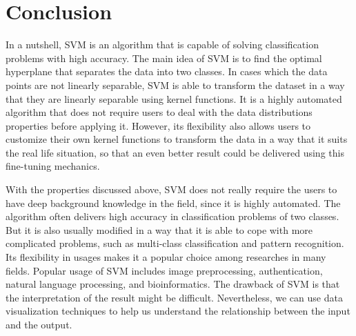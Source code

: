 
\section{Conclusion}
In a nutshell, SVM is an algorithm that is capable of solving classification
problems with high accuracy. The main idea of SVM is to find the optimal
hyperplane that separates the data into two classes. In cases which the data
points are not linearly separable, SVM is able to transform 
the dataset in a way that they are linearly separable using kernel functions.
It is a highly automated algorithm that does not require users to deal with
the data distributions properties before applying it. However, its flexibility
also allows users to customize their own kernel functions to transform the data
in a way that it suits the real life situation, so that an even better result
could be delivered using this fine-tuning mechanics.

With the properties discussed above, SVM does not really require the users to have deep background
knowledge in the field, since it is highly automated.
The algorithm often delivers high accuracy in classification
problems of two classes. But it is also usually modified in a way that it is able
to cope with more complicated problems, such as multi-class classification and
pattern recognition. Its flexibility in usages makes it a popular choice among
researches in many fields. 
Popular usage of SVM includes image preprocessing, authentication, natural language
processing, and bioinformatics.
The drawback of SVM is that the interpretation of the
result might be difficult. Nevertheless, we can use data visualization techniques
to help us understand the relationship between the input and the output.
